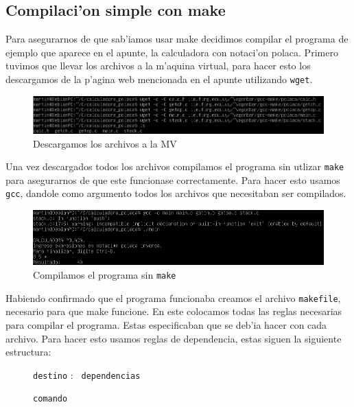 \documentclass[11pt]{article}
\newcommand{\codetext}[2]{\large\texttt{\textcolor{#1}{#2}}}
\begin{document}

	\subsection{Compilaci'on simple con make}
		Para asegurarnos de que sab'iamos usar make decidimos compilar el programa de ejemplo que aparece en el apunte, la calculadora con notaci'on polaca. Primero tuvimos que llevar los archivos a la m'aquina virtual, para hacer esto los descargamos de la p'agina web mencionada en el apunte utilizando \texttt{wget}.
		
		\begin{figure}[H]
				\centering
				\includegraphics[width=.9\linewidth]{Images/Seccion 2/S2.PNG}
				\caption{Descargamos los archivos a la MV}
				\label{fig:makefile-download}
		\end{figure}
		
		Una vez descargados todos los archivos compilamos el programa sin utlizar \texttt{make} para asegurarnos de que este funcionase correctamente. Para hacer esto usamos \texttt{gcc}, dandole como argumento todos los archivos que necesitaban ser compilados.
		
		\begin{figure}[H]
				\centering
				\includegraphics[width=.9\linewidth]{Images/Seccion 2/S2 parte dos.PNG}
				\caption{Compilamos el programa sin \texttt{make}}
				\label{fig:makefile-gcc-compile}
		\end{figure}
	
		Habiendo confirmado que el programa funcionaba creamos el archivo \texttt{makefile}, necesario para que make funcione. En este colocamos todas las reglas necesarias para compilar el programa. Estas especificaban que se deb'ia hacer con cada archivo. Para hacer esto usamos reglas de dependencia, estas siguen la siguiente estructura:
		
		\begin{figure}[H]
			\centering
			\begin{code-box}
				\codetext{light-blue}{\Large destino} : \codetext{orange-desert-vim}{ \Large dependencias}
				
				\qquad\codetext{light-red}{\Large comando}
			\end{code-box}
		\end{figure}
		
\end{document}
